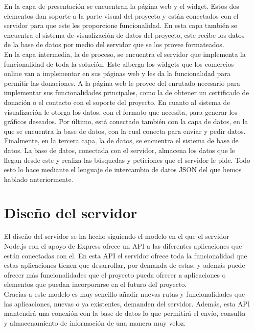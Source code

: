 En la capa de presentación se encuentran la página web y el widget. Estos dos elementos dan soporte a la parte visual del proyecto y están conectados con el servidor para que este les proporcione funcionalidad. En esta capa también se encuentra el sistema de visualización de datos del proyecto, este recibe los datos de la base de datos por medio del servidor que se los provee formateados.\\

En la capa intermedia, la de proceso, se encuentra el servidor que implementa la funcionalidad de toda la solución. Este alberga los widgets que los comercios online van a implementar en sus páginas web y les da la funcionalidad para permitir las donaciones. A la página web le provee del enrutado necesario para implementar sus funcionalidades principales, como la de obtener un certificado de donación o el contacto con el soporte del proyecto. En cuanto al sistema de visualización le otorga los datos, con el formato que necesita, para generar los gráficos deseados. Por último, está conectado también con la capa de datos, en la que se encuentra la base de datos, con la cual conecta para enviar y pedir datos.\\

Finalmente, en la tercera capa, la de datos, se encuentra el sistema de base de datos. La base de datos, conectada con el servidor, almacena los datos que le llegan desde este y realiza las búsquedas y peticiones que el servidor le pide. Todo esto lo hace mediante el lenguaje de intercambio de datos JSON del que hemos hablado anteriormente.


\section{Diseño del servidor}
El diseño del servidor se ha hecho siguiendo el modelo en el que el servidor Node.js con el apoyo de Express ofrece un API a las diferentes aplicaciones que están conectadas con el. En esta API el servidor ofrece toda la funcionalidad que estas aplicaciones tienen que desarrollar, por demanda de estas, y además puede ofrecer más funcionalidades que el proyecto pueda ofrecer a aplicaciones o elementos que puedan incorporarse en el futuro del proyecto.\\

Gracias a este modelo es muy sencillo añadir nuevas rutas y funcionalidades que las aplicaciones, nuevas o ya existentes, demanden del servidor. Además, esta API mantendrá una conexión con la base de datos lo que permitirá el envío, consulta y almacenamiento de información de una manera muy veloz.\\

